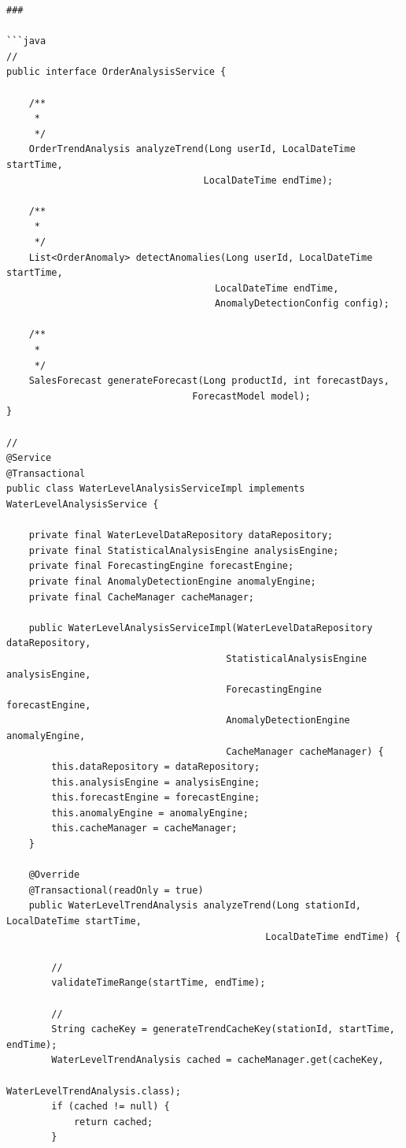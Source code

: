 \begin{verbatim}
### 

```java
// 
public interface OrderAnalysisService {
    
    /**
     * 
     */
    OrderTrendAnalysis analyzeTrend(Long userId, LocalDateTime startTime, 
                                   LocalDateTime endTime);
    
    /**
     * 
     */
    List<OrderAnomaly> detectAnomalies(Long userId, LocalDateTime startTime, 
                                     LocalDateTime endTime, 
                                     AnomalyDetectionConfig config);
    
    /**
     * 
     */
    SalesForecast generateForecast(Long productId, int forecastDays,
                                 ForecastModel model);
}

// 
@Service
@Transactional
public class WaterLevelAnalysisServiceImpl implements WaterLevelAnalysisService {
    
    private final WaterLevelDataRepository dataRepository;
    private final StatisticalAnalysisEngine analysisEngine;
    private final ForecastingEngine forecastEngine;
    private final AnomalyDetectionEngine anomalyEngine;
    private final CacheManager cacheManager;
    
    public WaterLevelAnalysisServiceImpl(WaterLevelDataRepository dataRepository,
                                       StatisticalAnalysisEngine analysisEngine,
                                       ForecastingEngine forecastEngine,
                                       AnomalyDetectionEngine anomalyEngine,
                                       CacheManager cacheManager) {
        this.dataRepository = dataRepository;
        this.analysisEngine = analysisEngine;
        this.forecastEngine = forecastEngine;
        this.anomalyEngine = anomalyEngine;
        this.cacheManager = cacheManager;
    }
    
    @Override
    @Transactional(readOnly = true)
    public WaterLevelTrendAnalysis analyzeTrend(Long stationId, LocalDateTime startTime, 
                                              LocalDateTime endTime) {
        
        // 
        validateTimeRange(startTime, endTime);
        
        // 
        String cacheKey = generateTrendCacheKey(stationId, startTime, endTime);
        WaterLevelTrendAnalysis cached = cacheManager.get(cacheKey, 
                                                         WaterLevelTrendAnalysis.class);
        if (cached != null) {
            return cached;
        }
        

\end{verbatim}
